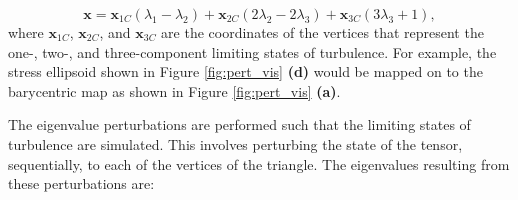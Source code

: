 \begin{equation}\label{equ:barycentric_mapping}
    \textbf{x} = \textbf{x}_{1C} (\lambda_1 - \lambda_2) + \textbf{x}_{2C} (2\lambda_2 - 2\lambda_3) + \textbf{x}_{3C} (3\lambda_3 + 1), 
\end{equation}
where $\textbf{x}_{1C}$, $\textbf{x}_{2C}$, and $\textbf{x}_{3C}$ are the coordinates of the vertices that represent the one-, two-, and three-component limiting states of turbulence.
For example, the stress ellipsoid shown in Figure \ref{fig:pert_vis} \textbf{(d)} would be mapped on to the barycentric map as shown in Figure \ref{fig:pert_vis} \textbf{(a)}.

The eigenvalue perturbations are performed such that the limiting states of turbulence are simulated.
This involves perturbing the state of the tensor, sequentially, to each of the vertices of the triangle.
The eigenvalues resulting from these perturbations are: 

